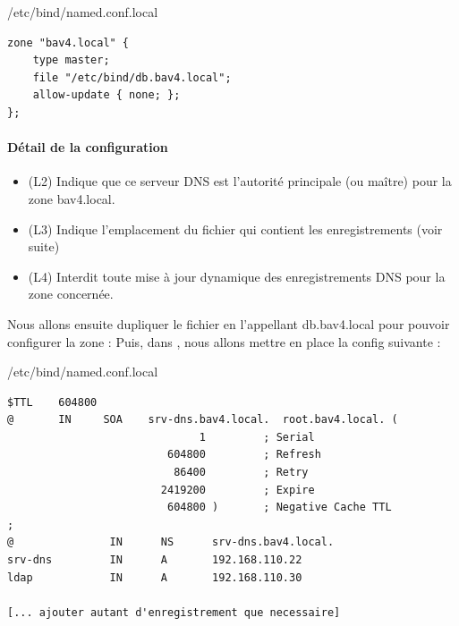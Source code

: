 \documentclass{article}
\begin{document}
\begin{configbox}{/etc/bind/named.conf.local}
\begin{lstlisting}
zone "bav4.local" {
    type master;
    file "/etc/bind/db.bav4.local";
    allow-update { none; };
};
\end{lstlisting}
\end{configbox}
\paragraph{Détail de la configuration}
\begin{itemize}
	\item (L2) Indique que ce serveur DNS est l'autorité principale (ou maître) pour la zone bav4.local.
	\item (L3) Indique l'emplacement du fichier qui contient les enregistrements (voir suite)
	\item (L4) Interdit toute mise à jour dynamique des enregistrements DNS pour la zone concernée.
\end{itemize}

Nous allons ensuite dupliquer le fichier  en l’appellant db.bav4.local pour pouvoir configurer la zone : 
Puis, dans , nous allons mettre en place la config suivante :
\label{subsubsec:confzonedns}
\begin{configbox}{/etc/bind/named.conf.local}
\begin{lstlisting}
$TTL    604800
@       IN     SOA    srv-dns.bav4.local.  root.bav4.local. (
                              1         ; Serial
                         604800         ; Refresh
                          86400         ; Retry
                        2419200         ; Expire
                         604800 )       ; Negative Cache TTL
;
@               IN      NS      srv-dns.bav4.local.
srv-dns         IN      A       192.168.110.22
ldap			IN		A		192.168.110.30

[... ajouter autant d'enregistrement que necessaire]
\end{lstlisting}
\end{configbox}
\end{document}
